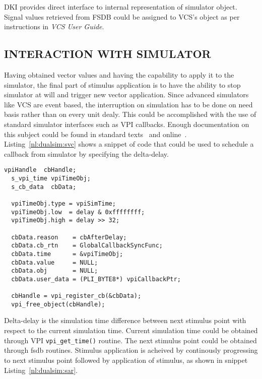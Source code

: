 DKI provides direct interface to internal representation of simulator object. Signal values retrieved from FSDB could be assigned to VCS's object as per instructions in {\it VCS User Guide}\cite[Section~C~Language~Interface>~Direct~C]{VCS:vcs.pdf}.

\subsection{INTERACTION WITH SIMULATOR}
Having obtained vector values and having the capability to apply it to the simulator, the final part of stimulus application is to have the ability to stop simulator at will and trigger new vector application. Since advanced simulators like VCS are event based, the interruption on simulation  has to be done on need basis rather than on every unit dealy. This could be accomplished with the use of standard simulator interfaces such as VPI callbacks. Enough documentation on this subject could be found in standard texts\cite{ss:pli:1999}~\cite{sm:pli:1999} and online\cite{wiki:2013:VPI}~\cite{aw:2013:VPI}. Listing~\ref{nl:dualsim:svc} shows a snippet of code that could be used to schedule a callback from simulator by specifying the delta-delay.

\lstset{language=C++,
basicstyle=\footnotesize,
frame=shadowbox,
breaklines=true}          
\begin{lstlisting}[frame=single, caption=Scheduling a VPI callback,label=nl:dualsim:svc] 
  vpiHandle  cbHandle;
  s_vpi_time vpiTimeObj;
  s_cb_data  cbData;

  vpiTimeObj.type = vpiSimTime;
  vpiTimeObj.low  = delay & 0xffffffff;
  vpiTimeObj.high = delay >> 32;

  cbData.reason    = cbAfterDelay;
  cbData.cb_rtn    = GlobalCallbackSyncFunc;
  cbData.time      = &vpiTimeObj;
  cbData.value     = NULL;
  cbData.obj       = NULL;
  cbData.user_data = (PLI_BYTE8*) vpiCallbackPtr;

  cbHandle = vpi_register_cb(&cbData);
  vpi_free_object(cbHandle);
\end{lstlisting}

Delta-delay is the simulation time difference between next stimulus point with respect to the current simulation time. Current simulation time could be obtained through VPI \verb|vpi_get_time()| routine. The next stimulus point could be obtained through fsdb routines. Stimulus application is acheived by continously progressing to next stimulus point followed by application of stimulus, as shown in snippet Listing~\ref{nl:dualsim:sar}.

